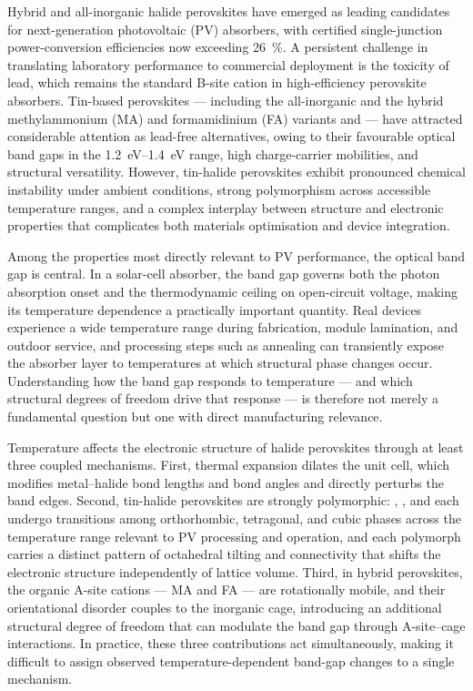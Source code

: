 Hybrid and all-inorganic halide perovskites have emerged as leading
candidates for next-generation photovoltaic (PV) absorbers, with
certified single-junction power-conversion efficiencies now
exceeding \SI{26}{\percent}.\cite{ref_efficiency}
A persistent challenge in translating laboratory performance to
commercial deployment is the toxicity of lead, which remains the
standard B-site cation in high-efficiency perovskite absorbers.
\cite{ref_pb_toxicity}
Tin-based perovskites --- including the all-inorganic \CsSnI{} and
the hybrid methylammonium (MA) and formamidinium (FA) variants
\MASnI{} and \FASnI{} --- have attracted considerable attention as
lead-free alternatives, owing to their favourable optical band gaps
in the \SIrange{1.2}{1.4}{eV} range, high charge-carrier mobilities,
and structural versatility.\cite{pitaro2022tin, stoumpos2013semiconducting}
However, tin-halide perovskites exhibit pronounced chemical
instability under ambient conditions, strong polymorphism across
accessible temperature ranges, and a complex interplay between
structure and electronic properties that complicates both materials
optimisation and device integration.\cite{ref_sn_instability}

Among the properties most directly relevant to PV performance, the
optical band gap is central.
In a solar-cell absorber, the band gap governs both the photon
absorption onset and the thermodynamic ceiling on open-circuit
voltage, making its temperature dependence a practically important
quantity.
Real devices experience a wide temperature range during fabrication,
module lamination, and outdoor service, and processing steps such as
annealing can transiently expose the absorber layer to temperatures
at which structural phase changes occur.\cite{ref_processing_temp}
Understanding how the band gap responds to temperature --- and which
structural degrees of freedom drive that response --- is therefore
not merely a fundamental question but one with direct manufacturing
relevance.

Temperature affects the electronic structure of halide perovskites
through at least three coupled mechanisms.
First, thermal expansion dilates the unit cell, which modifies
metal--halide bond lengths and bond angles and directly perturbs
the band edges.\cite{huang2013electronic}
Second, tin-halide perovskites are strongly polymorphic:
\CsSnI{}, \MASnI{}, and \FASnI{} each undergo transitions among
orthorhombic, tetragonal, and cubic phases across the temperature
range relevant to PV processing and operation, and each polymorph
carries a distinct pattern of octahedral tilting and connectivity
that shifts the electronic structure independently of lattice
volume.\cite{schueller2018crystal, stoumpos2013semiconducting}
Third, in hybrid perovskites, the organic A-site cations --- MA and
FA --- are rotationally mobile, and their orientational disorder
couples to the inorganic  cage, introducing an additional
structural degree of freedom that can modulate the band gap through
A-site--cage interactions.\cite{laven2023rotational, maheshwari2019relation}
In practice, these three contributions act simultaneously, making it
difficult to assign observed temperature-dependent band-gap changes
to a single mechanism.

